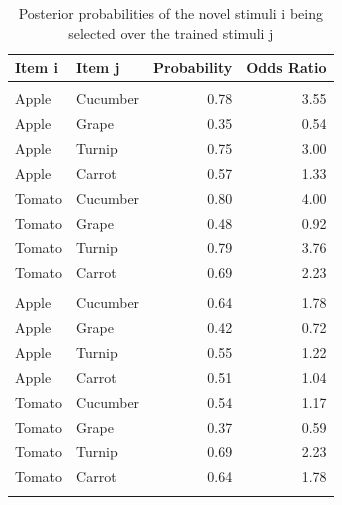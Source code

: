 \documentclass[
]{book}
\begin{document}
\begin{table}

\caption{\label{tab:unnamed-chunk-72}Posterior probabilities of the novel stimuli i being selected over the trained stimuli j}
\centering
\begin{tabular}[t]{llrr}
\toprule
Item i & Item j & Probability & Odds Ratio\\
\midrule
\addlinespace[0.3em]
\multicolumn{4}{l}{\textbf{Gorilla}}\\
\hspace{1em}Apple & Cucumber & 0.78 & 3.55\\
\hspace{1em}Apple & Grape & 0.35 & 0.54\\
\hspace{1em}Apple & Turnip & 0.75 & 3.00\\
\hspace{1em}Apple & Carrot & 0.57 & 1.33\\
\hspace{1em}Tomato & Cucumber & 0.80 & 4.00\\
\hspace{1em}Tomato & Grape & 0.48 & 0.92\\
\hspace{1em}Tomato & Turnip & 0.79 & 3.76\\
\hspace{1em}Tomato & Carrot & 0.69 & 2.23\\
\addlinespace[0.3em]
\multicolumn{4}{l}{\textbf{Chimpanzee}}\\
\hspace{1em}Apple & Cucumber & 0.64 & 1.78\\
\hspace{1em}Apple & Grape & 0.42 & 0.72\\
\hspace{1em}Apple & Turnip & 0.55 & 1.22\\
\hspace{1em}Apple & Carrot & 0.51 & 1.04\\
\hspace{1em}Tomato & Cucumber & 0.54 & 1.17\\
\hspace{1em}Tomato & Grape & 0.37 & 0.59\\
\hspace{1em}Tomato & Turnip & 0.69 & 2.23\\
\hspace{1em}Tomato & Carrot & 0.64 & 1.78\\
\addlinespace[0.3em]

\end{tabular}
\end{table}
\end{document}
